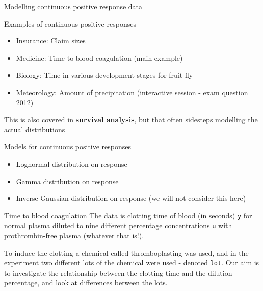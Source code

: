 \documentclass[
  ignorenonframetext,
]{beamer}
\providecommand{\tightlist}{%
  \setlength{\itemsep}{0pt}\setlength{\parskip}{0pt}}
\begin{document}
\begin{frame}{Modelling continuous positive response data}
\protect\hypertarget{modelling-continuous-positive-response-data}{}
\begin{block}{Examples of continuous positive responses}
\protect\hypertarget{examples-of-continuous-positive-responses}{}
\begin{itemize}
\tightlist
\item
  Insurance: Claim sizes
\item
  Medicine: Time to blood coagulation (main example)
\item
  Biology: Time in various development stages for fruit fly
\item
  Meteorology: Amount of precipitation (interactive session - exam
  question 2012)
\end{itemize}

This is also covered in \textbf{survival analysis}, but that often
sidesteps modelling the actual distributions
\end{block}
\end{frame}

\begin{frame}
\begin{block}{Models for continuous positive responses}
\protect\hypertarget{models-for-continuous-positive-responses}{}
\begin{itemize}
\tightlist
\item
  Lognormal distribution on response
\item
  Gamma distribution on response
\item
  Inverse Gaussian distribution on response (we will not consider this
  here)
\end{itemize}
\end{block}
\end{frame}

\begin{frame}[fragile]
\begin{block}{Time to blood coagulation}
\protect\hypertarget{time-to-blood-coagulation}{}
The data is clotting time of blood (in seconds) \texttt{y} for normal
plasma diluted to nine different percentage concentrations \texttt{u}
with prothrombin-free plasma (whatever that is!).

To induce the clotting a chemical called thromboplasting was used, and
in the experiment two different lots of the chemical were used - denoted
\texttt{lot}. Our aim is to investigate the relationship between the
clotting time and the dilution percentage, and look at differences
between the lots.
\end{block}
\end{frame}
\end{document}
